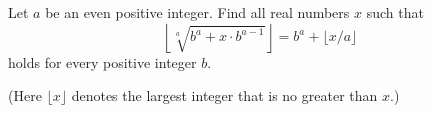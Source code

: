 Let \(a\) be an even positive integer. Find all real numbers \(x\) such that
\[
\left\lfloor \sqrt[a]{b^a + x \cdot b^{a-1}} \right\rfloor = b^a + \lfloor x/a \rfloor \tag{1}
\]
holds for every positive integer \(b\).

(Here \(\lfloor x \rfloor\) denotes the largest integer that is no greater than \(x\).)
